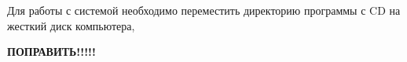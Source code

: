 Для работы с системой необходимо переместить директорию программы с CD на жесткий диск компьютера, 

\textbf{ПОПРАВИТЬ!!!!!}
